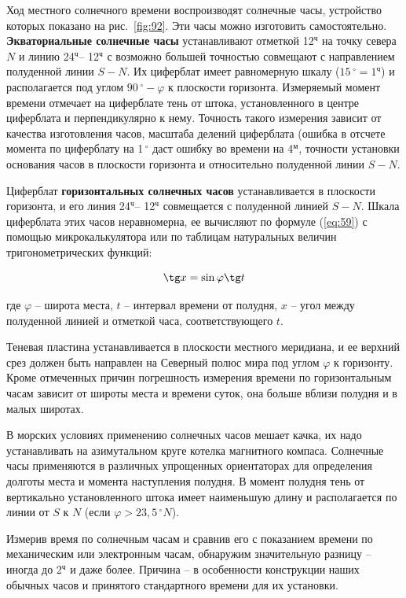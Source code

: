 \documentclass[a4paper, 12pt, twoside, final, book, russian, fittopage, cyremdash]{ncc}
\newcommand{\gr}{\ensuremath{\,^\circ}\xspace}
\newcommand{\ris}[1]{\ref{fig:#1}}
\newcommand{\tmin}{\ensuremath{^\text{м}}\xspace}
\newcommand{\thr}{\ensuremath{^\text{ч}}\xspace}
\begin{document}
Ход местного солнечного времени воспроизводят солнечные часы, устройство которых показано на рис.~\ris{92}. Эти часы можно изготовить самостоятельно. \textbf{Экваториальные солнечные часы} устанавливают отметкой 12\thr на точку севера $N$ и линию 24\thr \--- 12\thr с возможно большей точностью совмещают с направлением полуденной линии $S-N$. Их циферблат имеет равномерную шкалу ($15\gr = 1\thr$) и располагается под углом $90\gr - \varphi$ к плоскости горизонта. Измеряемый момент времени отмечает на циферблате тень от штока, установленного в центре циферблата и перпендикулярно к нему. Точность такого измерения зависит от качества изготовления часов, масштаба делений циферблата (ошибка в отсчете момента по циферблату на 1\gr даст ошибку во времени на 4\tmin, точности установки основания часов в плоскости горизонта и относительно полуденной линии $S-N$. 

Циферблат \textbf{горизонтальных солнечных часов} устанавливается в плоскости горизонта, и его линия 24\thr \--- 12\thr совмещается с полуденной линией $S-N$. Шкала циферблата этих часов неравномерна, ее вычисляют по формуле (\ref{eq:59}) с помощью микрокалькулятора или по таблицам натуральных величин тригонометрических функций: 

\begin{equation}
  \tg x = \sin \varphi \tg t \label{eq:59}
\end{equation}

где $\varphi$ \--- широта места, $t$ \--- интервал времени от полудня, $x$ \--- угол между полуденной линией и отметкой часа, соответствующего $t$.

Теневая пластина устанавливается в плоскости местного меридиана, и ее верхний срез должен быть направлен на Северный полюс мира под углом $\varphi$ к горизонту. Кроме отмеченных причин погрешность измерения времени по горизонтальным часам зависит от широты места и времени суток, она больше вблизи полудня и в малых широтах. 

В морских условиях применению солнечных часов мешает качка, их надо устанавливать на азимутальном круге котелка магнитного компаса. Солнечные часы применяются в различных упрощенных ориентаторах для определения долготы места и момента наступления полудня. В момент полудня тень от вертикально установленного штока имеет наименьшую длину и располагается по линии от $S$ к $N$ (если $\varphi > 23,5\gr N$).

Измерив время по солнечным часам и сравнив его с показанием времени по механическим или электронным часам, обнаружим значительную разницу \--- иногда до 2\thr и даже более. Причина \--- в особенности конструкции наших обычных часов и принятого стандартного времени для их установки.
\end{document}
